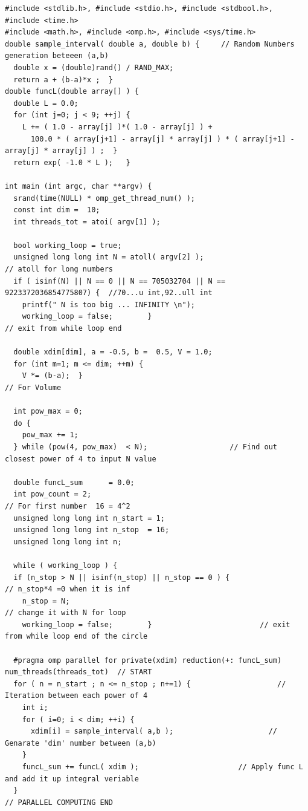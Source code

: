 \documentclass{article}
\begin{document}
\begin{program}
	\begin{verbatim}
#include <stdlib.h>, #include <stdio.h>, #include <stdbool.h>, #include <time.h>
#include <math.h>, #include <omp.h>, #include <sys/time.h>
double sample_interval( double a, double b) {     // Random Numbers generation beteeen (a,b)
  double x = (double)rand() / RAND_MAX;
  return a + (b-a)*x ;  }
double funcL(double array[] ) {
  double L = 0.0;
  for (int j=0; j < 9; ++j) {
    L += ( 1.0 - array[j] )*( 1.0 - array[j] ) + 
      100.0 * ( array[j+1] - array[j] * array[j] ) * ( array[j+1] - array[j] * array[j] ) ;  }
  return exp( -1.0 * L );   }

int main (int argc, char **argv) {
  srand(time(NULL) * omp_get_thread_num() );
  const int dim =  10;
  int threads_tot = atoi( argv[1] );

  bool working_loop = true;
  unsigned long long int N = atoll( argv[2] );                            // atoll for long numbers
  if ( isinf(N) || N == 0 || N == 705032704 || N == 9223372036854775807) {  //70...u int,92..ull int
    printf(" N is too big ... INFINITY \n");
    working_loop = false;        }                                      // exit from while loop end

  double xdim[dim], a = -0.5, b =  0.5, V = 1.0;                                 
  for (int m=1; m <= dim; ++m) {													
    V *= (b-a);  }	                                                                   // For Volume

  int pow_max = 0;
  do {
    pow_max += 1;
  } while (pow(4, pow_max)  < N);                   // Find out closest power of 4 to input N value

  double funcL_sum      = 0.0;
  int pow_count = 2;                                                  // For first number  16 = 4^2
  unsigned long long int n_start = 1;
  unsigned long long int n_stop  = 16;
  unsigned long long int n;

  while ( working_loop ) {
  if (n_stop > N || isinf(n_stop) || n_stop == 0 ) {                 // n_stop*4 =0 when it is inf   
    n_stop = N;                                                       // change it with N for loop
    working_loop = false;        }                         // exit from while loop end of the circle

  #pragma omp parallel for private(xdim) reduction(+: funcL_sum) num_threads(threads_tot)  // START
  for ( n = n_start ; n <= n_stop ; n+=1) {                    // Iteration between each power of 4
    int i;
    for ( i=0; i < dim; ++i) {
      xdim[i] = sample_interval( a,b );                      // Genarate 'dim' number between (a,b)
    }
    funcL_sum += funcL( xdim );                       // Apply func L and add it up integral veriable
  }                                                                       // PARALLEL COMPUTING END


\end{verbatim}
\end{program}
\end{document}
